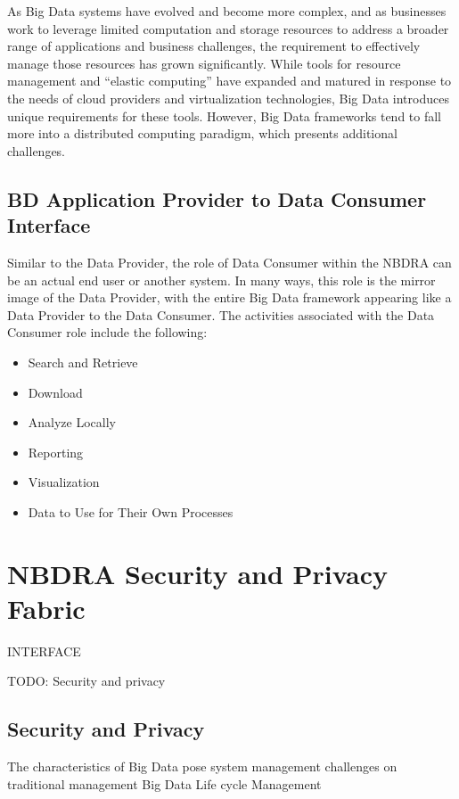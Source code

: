 \documentclass[11pt]{article}
\begin{document}
As Big Data systems have evolved and become more complex, and as businesses work to leverage limited 
computation and storage resources to address a broader range of applications and business challenges, the 
requirement to effectively manage those resources has grown significantly. While tools for resource 
management and “elastic computing” have expanded and matured in response to the needs of cloud 
providers and virtualization technologies, Big Data introduces unique requirements for these tools. 
However, Big Data frameworks tend to fall more into a distributed computing paradigm, which presents 
additional challenges. 

\subsection{BD Application Provider to Data Consumer Interface}

Similar to the Data Provider, the role of Data Consumer within the NBDRA can be an actual end user or 
another system. In many ways, this role is the mirror image of the Data Provider, with the entire Big Data 
framework appearing like a Data Provider to the Data Consumer. The activities associated with the Data 
Consumer role include the following:

\begin{itemize}
\item	Search and Retrieve
\item	Download
\item	Analyze Locally
\item	Reporting
\item	Visualization
\item	Data to Use for Their Own Processes
\end{itemize}


\section{NBDRA Security and Privacy Fabric}

INTERFACE

TODO: Security and privacy

\subsection{Security and Privacy}

The characteristics of Big Data pose system management challenges on traditional management Big Data 
Life cycle Management
\end{document}
